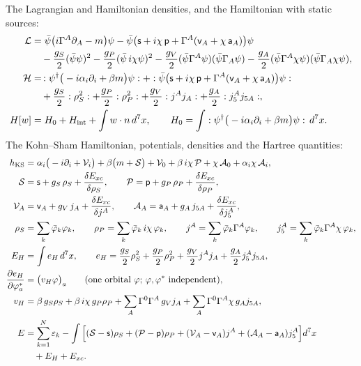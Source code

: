 \documentclass[10pt,a4paper]{article}
\begin{document}
The Lagrangian and Hamiltonian densities, and the Hamiltonian with static sources:
\begin{align*}
\mathcal L&=\bar\psi\big(i\Gamma^A\partial_A-m\big)\psi-\bar\psi\big(\mathsf s+i\chi\,\mathsf p+\Gamma^A(\mathsf v_A+\chi\,\mathsf a_A)\big)\psi \\
&\quad-\frac{g_S}{2}(\bar\psi\psi)^2-\frac{g_P}{2}(\bar\psi\,i\chi\psi)^2-\frac{g_V}{2}(\bar\psi\Gamma^A\psi)(\bar\psi\Gamma_A\psi)-\frac{g_A}{2}(\bar\psi\Gamma^A\chi\psi)(\bar\psi\Gamma_A\chi\psi), \\
\mathcal H&=\,:\psi^\dagger\big(-i\alpha_i\partial_i+\beta m\big)\psi:+:\bar\psi\big(\mathsf s+i\chi\,\mathsf p+\Gamma^A(\mathsf v_A+\chi\,\mathsf a_A)\big)\psi: \\
&\quad+\frac{g_S}{2}:\rho_S^2:+\frac{g_P}{2}:\rho_P^2:+\frac{g_V}{2}:j^Aj_A:+\frac{g_A}{2}:j_5^Aj_{5A}:, \\
H[w]&=H_0+H_{\rm int}+\int w\cdot n\,d^7x,\qquad H_0=\int:\psi^\dagger\big(-i\alpha_i\partial_i+\beta m\big)\psi:\,d^7x .
\end{align*}
The Kohn–Sham Hamiltonian, potentials, densities and the Hartree quantities:
\begin{align*}
h_{\rm KS}&=\alpha_i\big(-i\partial_i+\mathcal V_i\big)+\beta\big(m+\mathcal S\big)+\mathcal V_0+\beta\,i\chi\,\mathcal P+\chi\,\mathcal A_0+\alpha_i\chi\,\mathcal A_i, \\
\mathcal S&=\mathsf s+g_S\,\rho_S+\frac{\delta E_{xc}}{\delta\rho_S},\qquad \mathcal P=\mathsf p+g_P\,\rho_P+\frac{\delta E_{xc}}{\delta\rho_P}, \\
\mathcal V_A&=\mathsf v_A+g_V\,j_A+\frac{\delta E_{xc}}{\delta j^A},\qquad \mathcal A_A=\mathsf a_A+g_A\,j_{5A}+\frac{\delta E_{xc}}{\delta j_5^A}, \\
\rho_S&=\sum_k\bar\varphi_k\varphi_k,\qquad \rho_P=\sum_k\bar\varphi_k\,i\chi\,\varphi_k,\qquad j^A=\sum_k\bar\varphi_k\Gamma^A\varphi_k,\qquad j_5^A=\sum_k\bar\varphi_k\Gamma^A\chi\,\varphi_k, \\
E_H&=\int e_H\,d^7x,\qquad e_H=\frac{g_S}{2}\rho_S^2+\frac{g_P}{2}\rho_P^2+\frac{g_V}{2}j^Aj_A+\frac{g_A}{2}j_5^Aj_{5A}, \\
\frac{\partial e_H}{\partial\varphi_a^*}&=\big(v_H\varphi\big)_a\qquad(\text{one orbital }\varphi\text{; }\varphi,\varphi^*\text{ independent}), \\
v_H&=\beta\,g_S\rho_S+\beta\,i\chi\,g_P\rho_P+\sum_A\Gamma^0\Gamma^A\,g_Vj_A+\sum_A\Gamma^0\Gamma^A\chi\,g_Aj_{5A}, \\
E&=\sum_{k=1}^{N}\varepsilon_k-\int\Big[(\mathcal S-\mathsf s)\rho_S+(\mathcal P-\mathsf p)\rho_P+(\mathcal V_A-\mathsf v_A)j^A+(\mathcal A_A-\mathsf a_A)j_5^A\Big]d^7x \\
&\quad+E_H+E_{xc}.
\end{align*}
\end{document}

